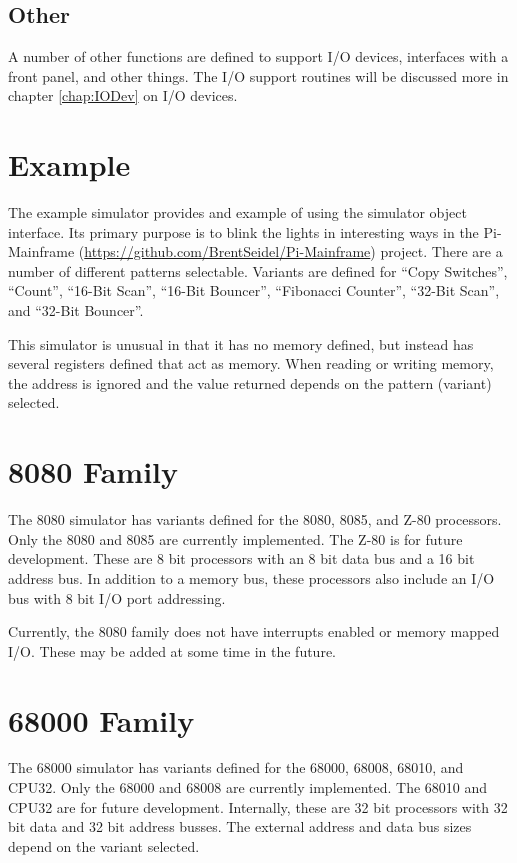 \documentclass[10pt, openany]{book}
\begin{document}
\subsection{Other}
A number of other functions are defined to support I/O devices, interfaces with a front panel, and other things.  The I/O support routines will be discussed more in chapter \ref{chap:IODev} on I/O devices.
\section{Example}
The example simulator provides and example of using the simulator object interface.  Its primary purpose is to blink the lights in interesting ways in the Pi-Mainframe (\url{https://github.com/BrentSeidel/Pi-Mainframe}) project.  There are a number of different patterns selectable.  Variants are defined for ``Copy Switches'', ``Count'', ``16-Bit Scan'', ``16-Bit Bouncer'', ``Fibonacci Counter'', ``32-Bit Scan'', and ``32-Bit Bouncer''.

This simulator is unusual in that it has no memory defined, but instead has several registers defined that act as memory.  When reading or writing memory, the address is ignored and the value returned depends on the pattern (variant) selected.

\section{8080 Family}
The 8080 simulator has variants defined for the 8080, 8085, and Z-80 processors.  Only the 8080 and 8085 are currently implemented.  The Z-80 is for future development.  These are 8 bit processors with an 8 bit data bus and a 16 bit address bus.  In addition to a memory bus, these processors also include an I/O bus with 8 bit I/O port addressing.

Currently, the 8080 family does not have interrupts enabled or memory mapped I/O.  These may be added at some time in the future.

\section{68000 Family}
The 68000 simulator has variants defined for the 68000, 68008, 68010, and CPU32.  Only the 68000 and 68008 are currently implemented.  The 68010 and CPU32 are for future development.  Internally, these are 32 bit processors with 32 bit data and 32 bit address busses.  The external address and data bus sizes depend on the variant selected.
\end{document}
